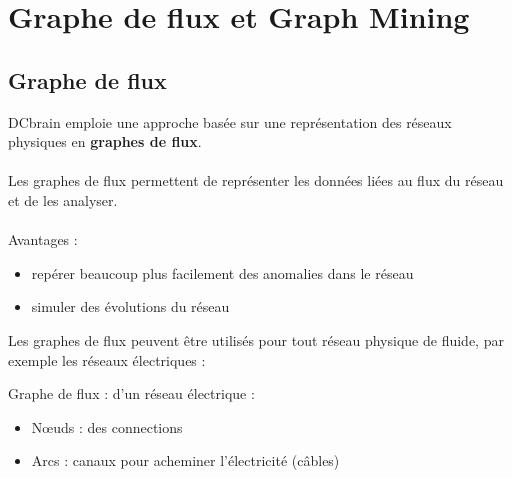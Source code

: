 	\section{Graphe de flux et Graph Mining}
	\subsection{Graphe de flux}
	\begin{frame}
		DCbrain emploie une approche basée sur une représentation des réseaux physiques en \textbf{graphes de flux}.
		\\~\\
		\pause
		Les graphes de flux permettent de représenter les données liées au flux du réseau et de les analyser.
		\\~\\
		\pause
		Avantages :
		\begin{itemize}
		\pause
		\item repérer beaucoup plus facilement des anomalies dans le réseau
		\pause
		\item simuler des évolutions du réseau
		\end{itemize}
	\end{frame}
	\begin{frame}
		Les graphes de flux peuvent être utilisés pour tout réseau physique de fluide, par exemple les réseaux électriques :
		\pause
		\begin{exampleblock}{Graphe de flux : d'un réseau électrique :}
		\begin{itemize}
		\item Nœuds : des connections
		\item Arcs : canaux pour acheminer l'électricité (câbles)
		\end{itemize}
		\end{exampleblock}
	\end{frame}	
	
